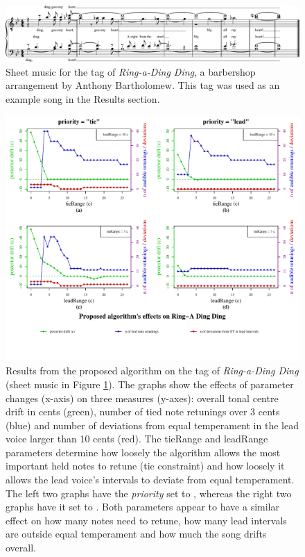 \documentclass[a4paper]{article}
\begin{document}
\begin{figure}
	\centering
	\includegraphics[width=\linewidth]{Figures/Ding_MuseScore.pdf}
	\caption{Sheet music for the tag of \textit{Ring-a-Ding Ding}, a barbershop arrangement by Anthony Bartholomew. This tag was used as an example song in the Results section.}
	\label{fig:ding_sheets}
\end{figure}

\begin{figure}
	\centering
	\includegraphics[width=\linewidth]{Results/effects_ring.pdf}
	\caption{Results from the proposed algorithm on the tag of \textit{Ring-a-Ding Ding} (sheet music in Figure \ref{fig:ding_sheets}). The graphs show the effects of parameter changes (x-axis) on three measures (y-axes): overall tonal centre drift in cents (green), number of tied note retunings over 3 cents (blue) and number of deviations from equal temperament in the lead voice larger than 10 cents (red). The tieRange and leadRange parameters determine how loosely the algorithm allows the most important held notes to retune (tie constraint) and how loosely it allows the lead voice's intervals to deviate from equal temperament. The left two graphs have the \textit{priority} set to , whereas the right two graphs have it set to . Both parameters appear to have a similar effect on how many notes need to retune, how many lead intervals are outside equal temperament and how much the song drifts overall.}
	\label{fig:results}
\end{figure}
\end{document}
